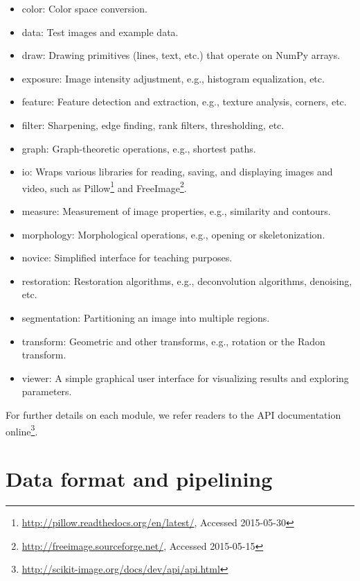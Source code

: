 \documentclass[fleqn,12pt]{wlpeerj}
\begin{document}
\begin{itemize}

    \item color: Color space conversion.
    \item data: Test images and example data.
    \item draw: Drawing primitives (lines, text, etc.) that operate on NumPy arrays.
    \item exposure: Image intensity adjustment, e.g., histogram equalization, etc.
    \item feature: Feature detection and extraction, e.g., texture analysis, corners, etc.
    \item filter: Sharpening, edge finding, rank filters, thresholding, etc.
    \item graph: Graph-theoretic operations, e.g., shortest paths.
    \item io: Wraps various libraries for reading, saving, and displaying images and video, such as Pillow\footnote{\url{http://pillow.readthedocs.org/en/latest/}, Accessed 2015-05-30} and FreeImage\footnote{\url{http://freeimage.sourceforge.net/}, Accessed 2015-05-15}.
    \item measure: Measurement of image properties, e.g., similarity and contours.
    \item morphology: Morphological operations, e.g., opening or skeletonization.
    \item novice: Simplified interface for teaching purposes.
    \item restoration: Restoration algorithms, e.g., deconvolution algorithms, denoising, etc.
    \item segmentation: Partitioning an image into multiple regions.
    \item transform: Geometric and other transforms, e.g., rotation or the Radon transform.
    \item viewer: A simple graphical user interface for visualizing results and exploring parameters.

\end{itemize}

For further details on each module, we refer readers to the API documentation
online\footnote{\url{http://scikit-image.org/docs/dev/api/api.html}}.



\section*{Data format and pipelining}
\label{sec:data-format-and-pipelining}
\end{document}
